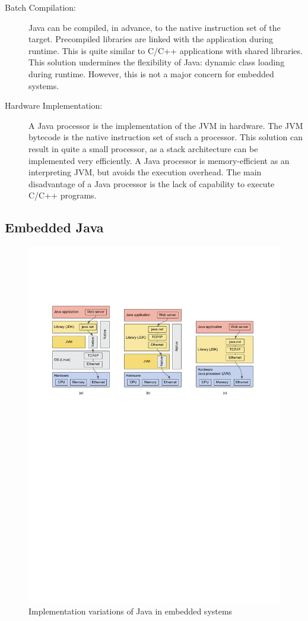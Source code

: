 \begin{description}
    \item[Batch Compilation:]
Java can be compiled, in advance, to the native instruction set of
the target. Precompiled libraries are linked with the application
during runtime. This is quite similar to C/C++ applications with
shared libraries. This solution undermines the flexibility of Java:
dynamic class loading during runtime. However, this is not a major
concern for embedded systems.


    \item[Hardware Implementation:]
A Java processor is the implementation of the JVM in hardware. The
JVM bytecode is the native instruction set of such a processor. This
solution can result in quite a small processor, as a stack
architecture can be implemented very efficiently. A Java processor
is memory-efficient as an interpreting JVM, but avoids the execution
overhead. The main disadvantage of a Java processor is the lack of
capability to execute C/C++ programs.

\end{description}

\subsection{Embedded Java}

\begin{figure}
    \centering
    \includegraphics[width=\textwidth]{visio/jvmall}
    \caption{Implementation variations of Java in embedded systems}\label{fig:java:embedded}
\end{figure}

